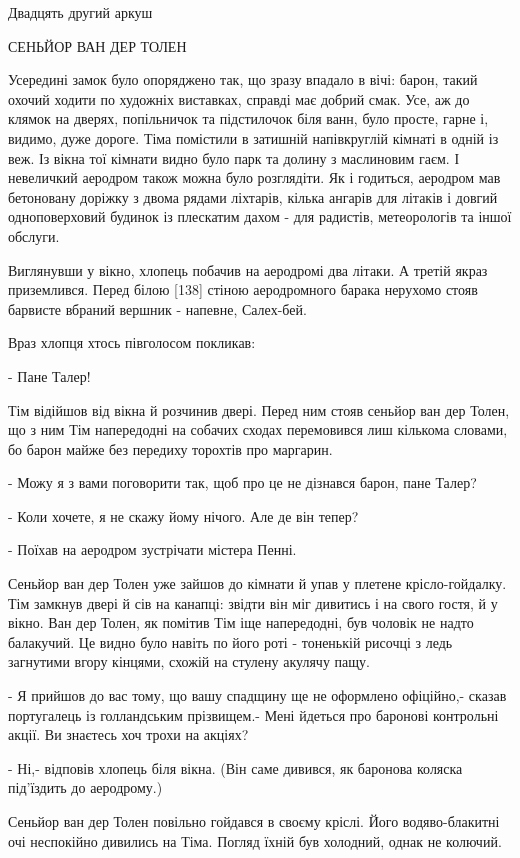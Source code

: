 Двадцять другий аркуш

СЕНЬЙОР ВАН ДЕР ТОЛЕН

Усередині замок було опоряджено так, що зразу впадало в вічі: барон, такий охочий ходити по художніх виставках, справді має добрий смак. Усе, аж до клямок на дверях, попільничок та підстилочок біля ванн, було просте, гарне і, видимо, дуже дороге. Тіма помістили в затишній напівкруглій кімнаті в одній із веж. Із вікна тої кімнати видно було парк та долину з маслиновим гаєм. І невеличкий аеродром також можна було розглядіти. Як і годиться, аеродром мав бетоновану доріжку з двома рядами ліхтарів, кілька ангарів для літаків і довгий одноповерховий будинок із плескатим дахом - для радистів, метеорологів та іншої обслуги.

Виглянувши у вікно, хлопець побачив на аеродромі два літаки. А третій якраз приземлився. Перед білою [138] стіною аеродромного барака нерухомо стояв барвисте вбраний вершник - напевне, Салех-бей.

Враз хлопця хтось півголосом покликав:

- Пане Талер!

Тім відійшов від вікна й розчинив двері. Перед ним стояв сеньйор ван дер Толен, що з ним Тім напередодні на собачих сходах перемовився лиш кількома словами, бо барон майже без передиху торохтів про маргарин.

- Можу я з вами поговорити так, щоб про це не дізнався барон, пане Талер?

- Коли хочете, я не скажу йому нічого. Але де він тепер?

- Поїхав на аеродром зустрічати містера Пенні.

Сеньйор ван дер Толен уже зайшов до кімнати й упав у плетене крісло-гойдалку. Тім замкнув двері й сів на канапці: звідти він міг дивитись і на свого гостя, й у вікно. Ван дер Толен, як помітив Тім іще напередодні, був чоловік не надто балакучий. Це видно було навіть по його роті - тоненькій рисочці з ледь загнутими вгору кінцями, схожій на стулену акулячу пащу.

- Я прийшов до вас тому, що вашу спадщину ще не оформлено офіційно,- сказав португалець із голландським прізвищем.- Мені йдеться про баронові контрольні акції. Ви знаєтесь хоч трохи на акціях?

- Ні,- відповів хлопець біля вікна. (Він саме дивився, як баронова коляска під'їздить до аеродрому.)

Сеньйор ван дер Толен повільно гойдався в своєму кріслі. Його водяво-блакитні очі неспокійно дивились на Тіма. Погляд їхній був холодний, однак не колючий.

